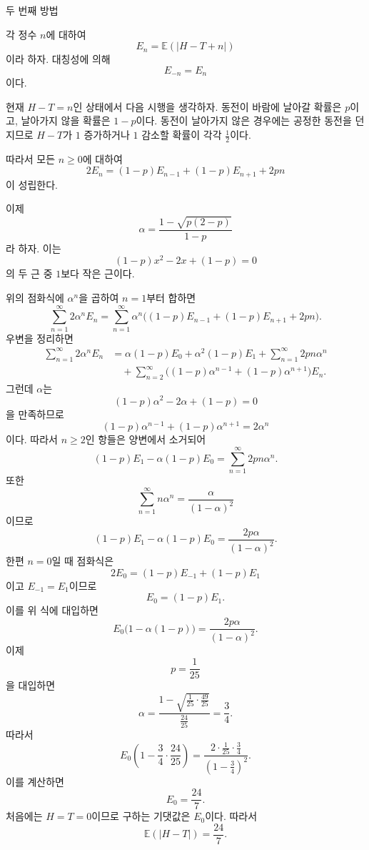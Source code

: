 \documentclass{article}
\begin{document}
두 번째 방법

각 정수 \(n\)에 대하여
\[ E_n=\mathbb{E}(|H-T+n|) \]
이라 하자. 대칭성에 의해
\[ E_{-n}=E_n \]
이다.

현재 \(H-T=n\)인 상태에서 다음 시행을 생각하자. 동전이 바람에 날아갈 확률은 \(p\)이고, 날아가지 않을 확률은 \(1-p\)이다. 동전이 날아가지 않은 경우에는 공정한 동전을 던지므로 \(H-T\)가 \(1\) 증가하거나 \(1\) 감소할 확률이 각각 \(\frac12\)이다.

따라서 모든 \(n\ge 0\)에 대하여
\[ 2E_n=(1-p)E_{n-1}+(1-p)E_{n+1}+2pn \]
이 성립한다.

이제
\[ \alpha=\frac{1-\sqrt{p(2-p)}}{1-p} \]
라 하자. 이는
\[ (1-p)x^2-2x+(1-p)=0 \]
의 두 근 중 \(1\)보다 작은 근이다.

위의 점화식에 \(\alpha^n\)을 곱하여 \(n=1\)부터 합하면
\[ \sum_{n=1}^{\infty}2\alpha^nE_n = \sum_{n=1}^{\infty} \alpha^n\bigl((1-p)E_{n-1}+(1-p)E_{n+1}+2pn\bigr). \]
우변을 정리하면
\[
\begin{aligned}
\sum_{n=1}^{\infty}2\alpha^nE_n
&=\alpha(1-p)E_0+\alpha^2(1-p)E_1 +\sum_{n=1}^{\infty}2pn\alpha^n\\
&\quad +\sum_{n=2}^{\infty} \bigl((1-p)\alpha^{n-1}+(1-p)\alpha^{n+1}\bigr)E_n.
\end{aligned}
\]
그런데 \(\alpha\)는
\[ (1-p)\alpha^2-2\alpha+(1-p)=0 \]
을 만족하므로
\[ (1-p)\alpha^{n-1}+(1-p)\alpha^{n+1} =2\alpha^n \]
이다. 따라서 \(n\ge2\)인 항들은 양변에서 소거되어
\[ (1-p)E_1-\alpha(1-p)E_0 = \sum_{n=1}^{\infty}2pn\alpha^n. \]
또한
\[ \sum_{n=1}^{\infty}n\alpha^n = \frac{\alpha}{(1-\alpha)^2} \]
이므로
\[ (1-p)E_1-\alpha(1-p)E_0 = \frac{2p\alpha}{(1-\alpha)^2}. \]
한편 \(n=0\)일 때 점화식은
\[ 2E_0=(1-p)E_{-1}+(1-p)E_1 \]
이고 \(E_{-1}=E_1\)이므로
\[ E_0=(1-p)E_1. \]
이를 위 식에 대입하면
\[ E_0\bigl(1-\alpha(1-p)\bigr) = \frac{2p\alpha}{(1-\alpha)^2}. \]
이제
\[ p=\frac1{25} \]
을 대입하면
\[ \alpha = \frac{1-\sqrt{\frac1{25}\cdot\frac{49}{25}}} {\frac{24}{25}} = \frac34. \]
따라서
\[ E_0 \left( 1-\frac34\cdot\frac{24}{25} \right) = \frac{2\cdot\frac1{25}\cdot\frac34} {\left(1-\frac34\right)^2}. \]
이를 계산하면
\[ E_0=\frac{24}{7}. \]
처음에는 \(H=T=0\)이므로 구하는 기댓값은 \(E_0\)이다. 따라서
\[ \boxed{\mathbb{E}(|H-T|)=\frac{24}{7}}. \]
\end{document}
